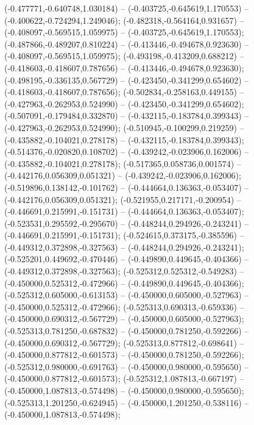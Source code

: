 (-0.477771,-0.640748,1.030184) -- (-0.403725,-0.645619,1.170553) -- (-0.400622,-0.724294,1.249046);
 (-0.482318,-0.564164,0.931657) -- (-0.408097,-0.569515,1.059975) -- (-0.403725,-0.645619,1.170553);
 (-0.487866,-0.489207,0.810224) -- (-0.413446,-0.494678,0.923630) -- (-0.408097,-0.569515,1.059975);
 (-0.493198,-0.413209,0.688212) -- (-0.418603,-0.418607,0.787656) -- (-0.413446,-0.494678,0.923630);
 (-0.498195,-0.336135,0.567729) -- (-0.423450,-0.341299,0.654602) -- (-0.418603,-0.418607,0.787656);
 (-0.502834,-0.258163,0.449155) -- (-0.427963,-0.262953,0.524990) -- (-0.423450,-0.341299,0.654602);
 (-0.507091,-0.179484,0.332870) -- (-0.432115,-0.183784,0.399343) -- (-0.427963,-0.262953,0.524990);
 (-0.510945,-0.100299,0.219259) -- (-0.435882,-0.104021,0.278178) -- (-0.432115,-0.183784,0.399343);
 (-0.514376,-0.020820,0.108702) -- (-0.439242,-0.023906,0.162006) -- (-0.435882,-0.104021,0.278178);
 (-0.517365,0.058736,0.001574) -- (-0.442176,0.056309,0.051321) -- (-0.439242,-0.023906,0.162006);
 (-0.519896,0.138142,-0.101762) -- (-0.444664,0.136363,-0.053407) -- (-0.442176,0.056309,0.051321);
 (-0.521955,0.217171,-0.200954) -- (-0.446691,0.215991,-0.151731) -- (-0.444664,0.136363,-0.053407);
 (-0.523531,0.295592,-0.295670) -- (-0.448244,0.294926,-0.243241) -- (-0.446691,0.215991,-0.151731);
 (-0.524615,0.373175,-0.385596) -- (-0.449312,0.372898,-0.327563) -- (-0.448244,0.294926,-0.243241);
 (-0.525201,0.449692,-0.470446) -- (-0.449890,0.449645,-0.404366) -- (-0.449312,0.372898,-0.327563);
 (-0.525312,0.525312,-0.549283) -- (-0.450000,0.525312,-0.472966) -- (-0.449890,0.449645,-0.404366);
 (-0.525312,0.605000,-0.613153) -- (-0.450000,0.605000,-0.527963) -- (-0.450000,0.525312,-0.472966);
 (-0.525313,0.690313,-0.659336) -- (-0.450000,0.690312,-0.567729) -- (-0.450000,0.605000,-0.527963);
 (-0.525313,0.781250,-0.687832) -- (-0.450000,0.781250,-0.592266) -- (-0.450000,0.690312,-0.567729);
 (-0.525313,0.877812,-0.698641) -- (-0.450000,0.877812,-0.601573) -- (-0.450000,0.781250,-0.592266);
 (-0.525312,0.980000,-0.691763) -- (-0.450000,0.980000,-0.595650) -- (-0.450000,0.877812,-0.601573);
 (-0.525312,1.087813,-0.667197) -- (-0.450000,1.087813,-0.574498) -- (-0.450000,0.980000,-0.595650);
 (-0.525313,1.201250,-0.624945) -- (-0.450000,1.201250,-0.538116) -- (-0.450000,1.087813,-0.574498);
